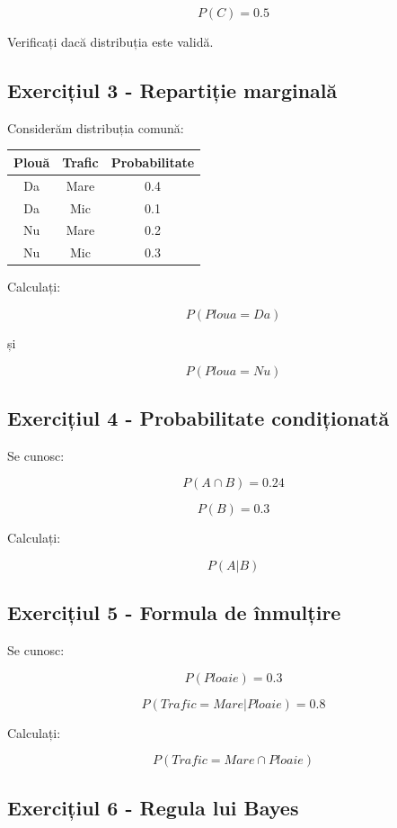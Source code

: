 \documentclass[12pt,a4paper]{article}
\begin{document}
\[
P(C)=0.5
\]

Verificați dacă distribuția este validă.

\subsection{Exercițiul 3 - Repartiție marginală}

Considerăm distribuția comună:

\begin{center}
\begin{tabular}{|c|c|c|}
\hline
Plouă & Trafic & Probabilitate \\
\hline
Da & Mare & 0.4 \\
Da & Mic & 0.1 \\
Nu & Mare & 0.2 \\
Nu & Mic & 0.3 \\
\hline
\end{tabular}
\end{center}

Calculați:

\[
P(Ploua=Da)
\]

și

\[
P(Ploua=Nu)
\]

\subsection{Exercițiul 4 - Probabilitate condiționată}

Se cunosc:

\[
P(A \cap B)=0.24
\]

\[
P(B)=0.3
\]

Calculați:

\[
P(A|B)
\]

\subsection{Exercițiul 5 - Formula de înmulțire}

Se cunosc:

\[
P(Ploaie)=0.3
\]

\[
P(Trafic=Mare|Ploaie)=0.8
\]

Calculați:

\[
P(Trafic=Mare \cap Ploaie)
\]

\subsection{Exercițiul 6 - Regula lui Bayes}
\end{document}
